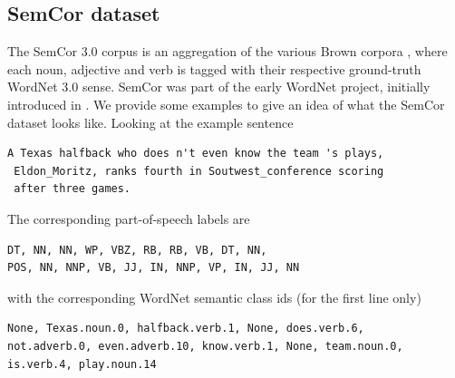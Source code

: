 \documentclass[a4paper,12pt,oneside,openright]{report}
\begin{document}
\subsection{SemCor dataset}

The SemCor 3.0 corpus is an aggregation of the various Brown corpora \cite{francis64}, where each noun, adjective and verb is tagged with their respective ground-truth WordNet 3.0 sense.
SemCor was part of the early WordNet project, initially introduced in \cite{miller94}.
We provide some examples to give an idea of what the SemCor dataset looks like.
Looking at the example sentence

\begin{tcolorbox}
\begin{verbatim}
A Texas halfback who does n't even know the team 's plays,
 Eldon_Moritz, ranks fourth in Soutwest_conference scoring 
 after three games.
\end{verbatim}
\end{tcolorbox}

The corresponding part-of-speech labels are

\begin{tcolorbox}
\begin{verbatim}
DT, NN, NN, WP, VBZ, RB, RB, VB, DT, NN, 
POS, NN, NNP, VB, JJ, IN, NNP, VP, IN, JJ, NN
\end{verbatim}
\end{tcolorbox}

with the corresponding WordNet semantic class ids (for the first line only)

\begin{tcolorbox}
\begin{verbatim}
None, Texas.noun.0, halfback.verb.1, None, does.verb.6,
not.adverb.0, even.adverb.10, know.verb.1, None, team.noun.0,
is.verb.4, play.noun.14
\end{verbatim}
\end{tcolorbox}
\end{document}
